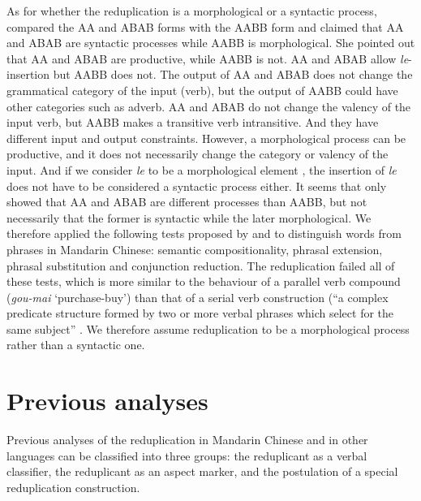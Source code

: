 \documentclass[
a4paper,
10pt,
oneside,
]{scrartcl}
\begin{document}
As for whether the reduplication is a morphological or a syntactic process, \citet{Xie2020} compared
the AA and ABAB forms with the AABB form and claimed that AA and ABAB are syntactic processes while
AABB is morphological. She pointed out that AA and ABAB are productive, while AABB is not. AA and
ABAB allow \emph{le}-insertion but AABB does not. The output of AA and ABAB does not change the
grammatical category of the input (verb), but the output of AABB could have other categories such as
adverb. AA and ABAB do not change the valency of the input verb, but AABB makes a transitive verb
intransitive. And they have different input and output constraints. However, a morphological process
can be productive, and it does not necessarily change the category or valency of the input. And if
we consider \emph{le} to be a morphological element \citep{Huangetal2009,
  MuellerLipenkova2013-short}, the insertion of \emph{le} does not have to be considered a syntactic
process either. It seems that \citet{Xie2020} only showed that AA and ABAB are different processes
than AABB, but not necessarily that the former is syntactic while the later morphological. We
therefore applied the following tests proposed by \citet{Duanmu1998} and \citet{Schaefer2009} to
distinguish words from phrases in Mandarin Chinese: semantic compositionality, phrasal extension,
phrasal substitution and conjunction reduction. The reduplication failed all of these tests, which
is more similar to the behaviour of a parallel verb compound (\emph{gou-mai} `purchase-buy') than
that of a serial verb construction (``a complex predicate structure formed by two or more verbal
phrases which select for the same subject'' \citep[235]{MuellerLipenkova2009-short}. We therefore
assume reduplication to be a morphological process rather than a syntactic one. 



\section[Previous analyses]{Previous analyses}\label{sec:Prev}

Previous analyses of the reduplication in Mandarin Chinese and in other languages can be classified
into three groups: the reduplicant as a verbal classifier, the reduplicant as an aspect marker, and
the postulation of a special reduplication construction. 
\end{document}
